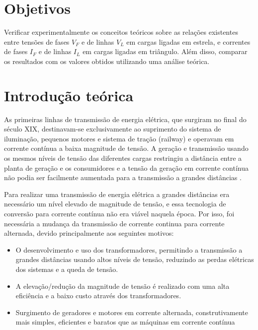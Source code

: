 \documentclass[a4paper,12pt,oneside,openany,table,xcdraw]{article}
\begin{document}
\newcommand{\thedepartment}{Faculdade de Engenharia Elétrica}
\newcommand{\thecourse}{FEELT}
\newcommand{\thetitle}{CIRCUITOS TRIFÁSICOS EQUILIBRADOS}
\newcommand{\thetype}{Relatório da Disciplina de Experimental de Circuitos Elétricos II}
\newcommand{\theproftitle}{Bacharel em Engenharia Elétrica}
\newcommand{\thestudent}{Lesly Viviane Montúfar Berrios\\
\centering11811ETE001}
\newcommand{\theadvisor}{Prof. Wellington Maycon Santos Bernardes}
\newcommand{\thecity}{Uberlândia}

\thispagestyle{empty}


\onehalfspacing
\tableofcontents %
\newpage

\section{Objetivos} %
Verificar experimentalmente os conceitos teóricos sobre as relações existentes entre tensões de fases $V_F$ e de linhas $V_L$ em cargas ligadas em estrela, e correntes de fases $I_F$ e de linhas $I_L$ em cargas ligadas em triângulo. Além disso, comparar os resultados com os valores obtidos utilizando uma análise teórica. 

\section{Introdução teórica} %
As primeiras linhas de transmissão de energia elétrica, que surgiram no final do século XIX, destinavam-se exclusivamente ao suprimento do sistema de iluminação, pequenos motores e sistema de tração (railway) e operavam em corrente contínua a baixa magnitude de tensão. A geração e transmissão usando os mesmos níveis de tensão das diferentes cargas restringiu a distância entre a planta de geração e os consumidores e a tensão da geração em corrente contínua não podia ser facilmente aumentada para a transmissão a grandes distâncias \cite{ph}. 

Para realizar uma transmissão de energia elétrica a grandes distâncias era necessário um nível elevado de magnitude de tensão, e essa tecnologia de conversão para corrente contínua não era viável naquela época. Por isso, foi necessária a mudança da transmissão de corrente continua para corrente alternada, devido principalmente aos seguintes motivos:

\begin{itemize}
\item O desenvolvimento e uso dos transformadores, permitindo a transmissão a grandes distâncias usando altos níveis de tensão, reduzindo as perdas elétricas dos sistemas e a queda de tensão.
\item A elevação/redução da magnitude de tensão é realizado com uma alta eficiência e a baixo custo através dos transformadores.
\item Surgimento de geradores e motores em corrente alternada, construtivamente mais simples, eficientes e baratos que as máquinas em corrente contínua
\end{itemize}
\end{document}
